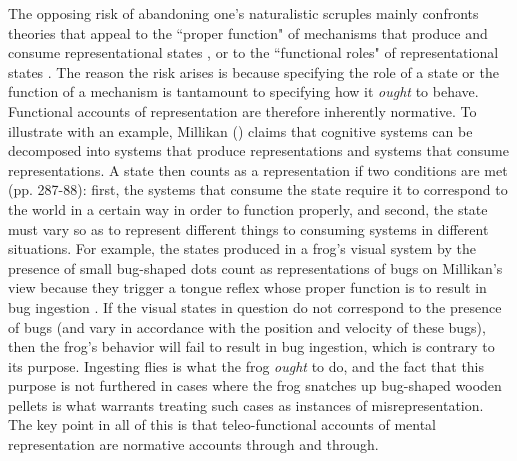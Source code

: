 The opposing risk of abandoning one's naturalistic scruples mainly confronts theories that appeal to the ``proper function" of mechanisms that produce and consume representational states \citep{Millikan:1989,Millikan:2005,Dretske:1986}, or to the ``functional roles" of representational states \citep{Block:1986,Harman:1982,Eliasmith:2000}. The reason the risk arises is because specifying the role of a state or the function of a mechanism is tantamount to specifying how it \textit{ought} to behave. Functional accounts of representation are therefore inherently normative. To illustrate with an example, Millikan (\citeyear{Millikan:1989}) claims that cognitive systems can be decomposed into systems that produce representations and systems that consume representations. A state then counts as a representation if two conditions are met (pp. 287-88): first, the systems that consume the state require it to correspond to the world in a certain way in order to function properly, and second, the state must vary so as to represent different things to consuming systems in different situations. For example, the states produced in a frog's visual system by the presence of small bug-shaped dots count as representations of bugs on Millikan's view because they trigger a tongue reflex whose proper function is to result in bug ingestion \citep[][p. 291]{Millikan:1989}. If the visual states in question do not correspond to the presence of bugs (and vary in accordance with the position and velocity of these bugs), then the frog's behavior will fail to result in bug ingestion, which is contrary to its purpose. Ingesting flies is what the frog \textit{ought} to do, and the fact that this purpose is not furthered in cases where the frog snatches up bug-shaped wooden pellets is what warrants treating such cases as instances of misrepresentation. The key point in all of this is that teleo-functional accounts of mental representation are normative accounts through and through. 

